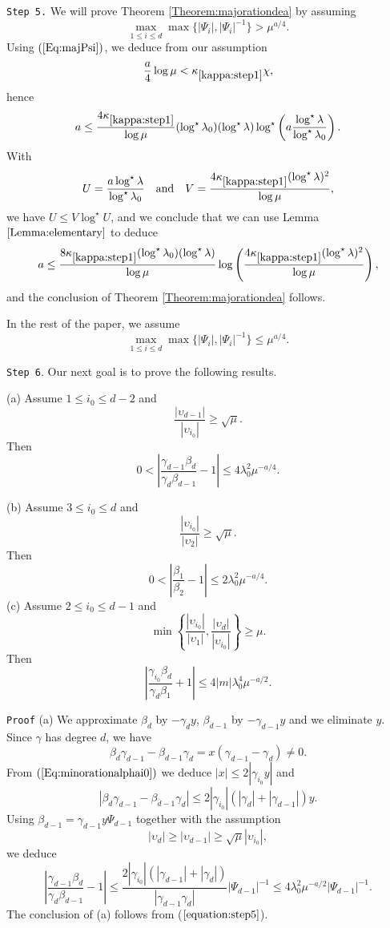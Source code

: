 \documentclass[leqno,11pt]{article}
\def\cst#1{\kappa_{\ref{#1}}}
\begin{document}
\indent
{\tt Step 5.} We will prove Theorem \ref{Theorem:majorationdea} by assuming 
$$
\max_{1\le i\le d}
\max\{|\Psi_i|, |\Psi_i|^{-1}\} > \mu^{ a/4}.
$$
Using $(\ref{Eq:majPsi})$, we deduce from our assumption
$$
\frac{ a}{4}\log \mu < \cst{kappa:step1} \chi,
$$
hence
$$
 a\le \frac{4\cst{kappa:step1}}{\log\mu}
 (\log^\star \lambda_0)(\log^\star \lambda)\log^\star\left( a
 \frac{\log^\star \lambda}{\log^\star \lambda_0}
 \right).
$$
With 
$$
 U=\frac{ a \log^\star \lambda}{\log^\star \lambda_0}
\quad \hbox{and} \quad
 V= \frac{4\cst{kappa:step1} (\log^\star \lambda)^2}{\log\mu} ,
 $$
 we have
 $U\le V\log^\star U$,
 and we conclude that 
we can use Lemma $\ref{Lemma:elementary}$ to deduce 
$$
 a\le
 \frac{8\cst{kappa:step1}(\log^\star \lambda_0)(\log^\star \lambda)}{\log\mu}
 \log \left(
 \frac{4\cst{kappa:step1}(\log^\star \lambda)^2}{\log\mu}
 \right),
$$
and the conclusion of Theorem \ref{Theorem:majorationdea}
 follows.
 
 In the rest of the paper, we assume
 \begin{equation}\label{equation:step5}
\max_{1\le i\le d}
\max\{|\Psi_i|, |\Psi_i|^{-1}\}\le \mu^{ a/4}.
\end{equation}
 
\indent
{\tt Step 6}. Our next goal is to prove the following results. 

\indent (a)
Assume $1\le i_0\le d-2$ and 
$$
\frac{|\upsilon_{d-1}|}{|\upsilon_{i_0}|}\ge \sqrt{ \mu}.
$$
Then 
$$ 
0<\left|
\frac{\gamma_{d-1}\beta_d}{\gamma_d \beta_{d-1}}-1
\right|
\le 4\lambda_0^2 \mu^{- a/4}.
$$
 
\indent (b) 
Assume $3\le i_0\le d$ and 
$$
\frac{|\upsilon_{i_0}|}{|\upsilon_2|}\ge \sqrt{ \mu}.
$$
Then
$$
0<
\left|
\frac{ \beta_1}{\beta_2}-1
\right| 
\le 2\lambda_0^2 \mu^{- a/4}.
$$
\indent (c) Assume $2\le i_0\le d-1$ and
$$
\min \left\{ \frac{ |\upsilon_{i_0}|}{ |\upsilon_1|}, \frac{ |\upsilon_d|}{ |\upsilon_{i_0}|}\right\}\ge \mu.
$$
Then
$$
\left|
\frac{
\gamma_{i_0}\beta_d}{\gamma_d \beta_1}+1
\right|
\le 4 |m| \lambda_0^4 \mu^{- a/2}.
$$

{\tt Proof} 
(a) We approximate $\beta_d$ by $-\gamma_dy$, $\beta_{d-1}$ by $-\gamma_{d-1}y$ and we eliminate $y$. Since $\gamma$ has degree $d$, we have
$$
\beta_d\gamma_{d-1}-\beta_{d-1}\gamma_d=x(\gamma_{d-1}-\gamma_d)\not=0.
$$
From %
$(\ref{Eq:minorationalphai0})$ we deduce $|x|\le 2|\gamma_{i_0} y|$ and
$$
|\beta_d\gamma_{d-1}-\beta_{d-1}\gamma_d|
\le
2 |\gamma_{i_0}| (|\gamma_d|+|\gamma_{d-1}|) y.
 $$
 Using $\beta_{d-1}=\gamma_{d-1}y\Psi_{d-1}$ together with the assumption
 $$
 |\upsilon_d|\ge|\upsilon_{d-1}|\ge \sqrt{ \mu} |\upsilon_{i_0}|,
 $$
 we deduce
 $$
 \left|
\frac{\gamma_{d-1}\beta_d}{\gamma_d \beta_{d-1}}-1
\right|
\le \frac{2 |\gamma_{i_0}|(|\gamma_{d-1}|+|\gamma_d|)}{|\gamma_{d-1}\gamma_d|}|\Psi_{d-1}|^{-1}\le
4\lambda_0^2\mu^{-a/2}|\Psi_{d-1}|^{-1}.
$$
The conclusion of (a) follows from ($\ref{equation:step5}$).
\end{document}
